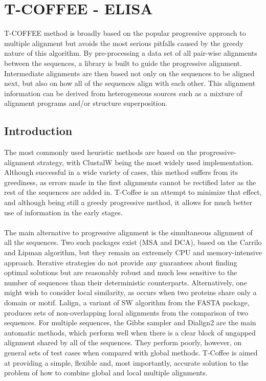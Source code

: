 \graphicspath{{chapters/images/}}
\chapter{T-COFFEE - ELISA}
T-COFFEE method is broadly based on the popular progressive approach to multiple alignment but avoids the most serious pitfalls caused by the greedy nature of this algorithm.
By pre-processing a data set of all pair-wise alignments between the sequences, a library is built to guide the progressive alignment.
Intermediate alignments are then based not only on the sequences to be aligned next, but also on how all of the sequences align with each other. This alignment information can be derived from heterogeneous sources such as a mixture of alignment programs and/or structure superposition.

\section{Introduction}
The most commonly used heuristic methods are based on the progressive-alignment strategy, with ClustalW being the most widely used implementation.
Although successful in a wide variety of cases, this method suffers from its greediness, as errors made in the first alignments cannot be rectified later as the rest of the sequences are added in.
T-Coffee is an attempt to minimize that effect, and although being still a greedy progressive method, it allows for much better use of information in the early stages.
\\
\\
\noindent
The main alternative to progressive alignment is the simultaneous alignment of all the sequences. Two such packages exist (MSA and DCA), based on the Carrilo and Lipman algorithm, but they remain an extremely CPU and memory-intensive approach.
Iterative strategies do not provide any guarantees about finding optimal solutions but are reasonably robust and much less sensitive to the number of sequences than their deterministic counterparts.
Alternatively, one might wish to consider local similarity, as occurs when two proteins share only a domain or motif.
Lalign, a variant of SW algorithm from the FASTA package, produces sets of non-overlapping local alignments from the comparison of two sequences.
For multiple sequences, the Gibbs sampler and Dialign2 are the main automatic methods, which perform well when there is a clear block of ungapped alignment shared by all of the sequences.
They perform poorly, however, on general sets of test cases when compared with global methods.
T-Coffee is aimed at providing a simple,  flexible and, most importantly, accurate solution to the problem of how to combine global and local multiple alignments.

